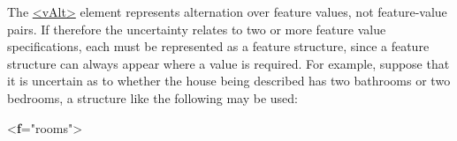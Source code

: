 The \hyperref[TEI.vAlt]{<vAlt>} element represents alternation over feature values, not feature-value pairs. If therefore the uncertainty relates to two or more feature value specifications, each must be represented as a feature structure, since a feature structure can always appear where a value is required. For example, suppose that it is uncertain as to whether the house being described has two bathrooms or two bedrooms, a structure like the following may be used: \par\bgroup{}\exampleFont \begin{shaded}\noindent\mbox{}{<\textbf{f}\hspace*{1em}{name}="{rooms}">}\mbox{}\newline 
{}\mbox{}\newline 
\hspace*{1em}\mbox{}\newline 
\hspace*{1em}\hspace*{1em}\mbox{}\newline 
\hspace*{1em}\hspace*{1em}\hspace*{1em}\mbox{}\newline 
\hspace*{1em}\hspace*{1em}\mbox{}\newline 
\hspace*{1em}\mbox{}\newline 
\hspace*{1em}\mbox{}\newline 

\end{shaded}

